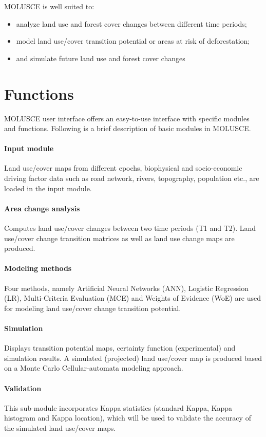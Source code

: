\documentclass{report}
\begin{document}
MOLUSCE is well suited to:
\begin{itemize}
  \item analyze land use and forest cover changes between different time periods;
  \item model land use/cover transition potential or areas at risk of deforestation; 
  \item and simulate future land use and forest cover changes
\end{itemize}


\section{Functions}
MOLUSCE user interface offers an easy-to-use interface with specific modules and functions.
Following is a brief description of basic modules in MOLUSCE.

\paragraph{Input module}
Land use/cover maps from different epochs, biophysical and socio-economic driving factor data
such as road network, rivers, topography, population etc., are loaded in the input module.

\paragraph{Area change analysis}
Computes land use/cover changes between two time periods (T1 and T2). Land use/cover change
transition matrices as well as land use change maps are produced.

\paragraph{Modeling methods}
Four methods, namely Artificial Neural Networks (ANN), Logistic Regression (LR), Multi-Criteria
Evaluation (MCE) and Weights of Evidence (WoE) are used for modeling land use/cover change
transition potential.

\paragraph{Simulation}
Displays transition potential maps, certainty function (experimental) and simulation results. A
simulated (projected) land use/cover map is produced based on a Monte Carlo Cellular-automata
modeling approach.

\paragraph{Validation}
This sub-module incorporates Kappa statistics (standard Kappa, Kappa histogram and Kappa
location), which will be used to validate the accuracy of the simulated land use/cover maps.
\end{document}

